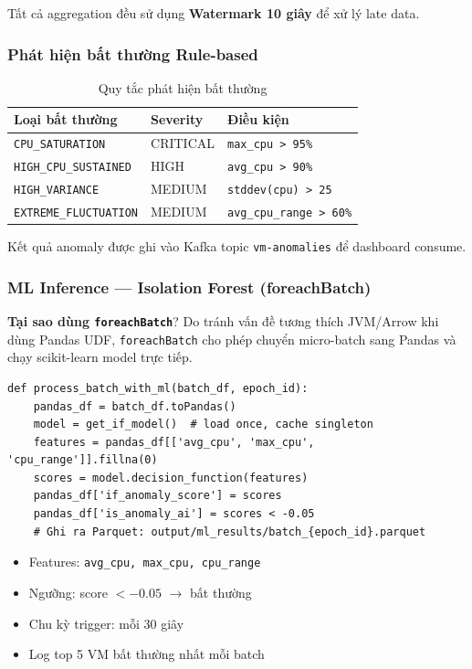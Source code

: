 \documentclass[12pt,a4paper]{article}
\begin{document}
Tất cả aggregation đều sử dụng \textbf{Watermark 10 giây} để xử lý late data.

\subsubsection{Phát hiện bất thường Rule-based}

\begin{table}[H]
\centering
\begin{tabularx}{\linewidth}{l l X}
\toprule
\textbf{Loại bất thường} & \textbf{Severity} & \textbf{Điều kiện} \\
\midrule
\texttt{CPU\_SATURATION} & CRITICAL & \texttt{max\_cpu > 95\%} \\
\texttt{HIGH\_CPU\_SUSTAINED} & HIGH & \texttt{avg\_cpu > 90\%} \\
\texttt{HIGH\_VARIANCE} & MEDIUM & \texttt{stddev(cpu) > 25} \\
\texttt{EXTREME\_FLUCTUATION} & MEDIUM & \texttt{avg\_cpu\_range > 60\%} \\
\bottomrule
\end{tabularx}
\caption{Quy tắc phát hiện bất thường}
\end{table}

Kết quả anomaly được ghi vào Kafka topic \texttt{vm-anomalies} để dashboard consume.

\subsubsection{ML Inference — Isolation Forest (foreachBatch)}

\textbf{Tại sao dùng \texttt{foreachBatch}}? Do tránh vấn đề tương thích JVM/Arrow khi dùng Pandas UDF, \texttt{foreachBatch} cho phép chuyển micro-batch sang Pandas và chạy scikit-learn model trực tiếp.

\begin{lstlisting}[style=python, caption={ML inference trong foreachBatch}]
def process_batch_with_ml(batch_df, epoch_id):
    pandas_df = batch_df.toPandas()
    model = get_if_model()  # load once, cache singleton
    features = pandas_df[['avg_cpu', 'max_cpu', 'cpu_range']].fillna(0)
    scores = model.decision_function(features)
    pandas_df['if_anomaly_score'] = scores
    pandas_df['is_anomaly_ai'] = scores < -0.05
    # Ghi ra Parquet: output/ml_results/batch_{epoch_id}.parquet
\end{lstlisting}

\begin{itemize}
  \item Features: \texttt{avg\_cpu, max\_cpu, cpu\_range}
  \item Ngưỡng: score $< -0.05$ $\rightarrow$ bất thường
  \item Chu kỳ trigger: mỗi 30 giây
  \item Log top 5 VM bất thường nhất mỗi batch
\end{itemize}
\end{document}
